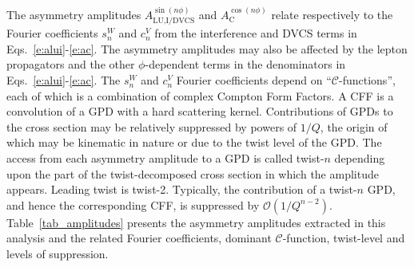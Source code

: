 The asymmetry amplitudes $A_{\textrm{LU,I/DVCS}}^{\sin(n\phi)}$ and
$A_{\textrm{C}}^{\cos(n\phi)}$ relate respectively to the Fourier
coefficients $s_{n}^{W}$ and $c_{n}^{V}$ from the interference and DVCS terms in Eqs.~\ref{e:alui}-\ref{e:ac}. The asymmetry amplitudes may also be affected by the lepton propagators and the other $\phi$-dependent terms in the denominators in Eqs.~\ref{e:alui}-\ref{e:ac}. The  $s_{n}^{W}$ and $c_{n}^{V}$ Fourier coefficients depend on ``$\mathcal{C}$-functions'', each of which is a combination of complex Compton Form Factors. A CFF is a convolution of a GPD with a hard scattering kernel. Contributions of GPDs to the cross section may be relatively suppressed by powers of $1/Q$, the origin of which may be kinematic in nature or due to the twist level of the GPD. The access from each asymmetry amplitude to a GPD is called twist-$n$ depending upon the part of the twist-decomposed cross section in which the amplitude appears. Leading twist is twist-2. Typically, the contribution of a twist-$n$ GPD, and hence the corresponding CFF, is suppressed by $\mathcal{O}(1/Q^{n-2})$. Table~\ref{tab_amplitudes} presents the asymmetry amplitudes extracted in this analysis and the related Fourier coefficients, dominant $\mathcal{C}$-function, twist-level and levels of suppression.

